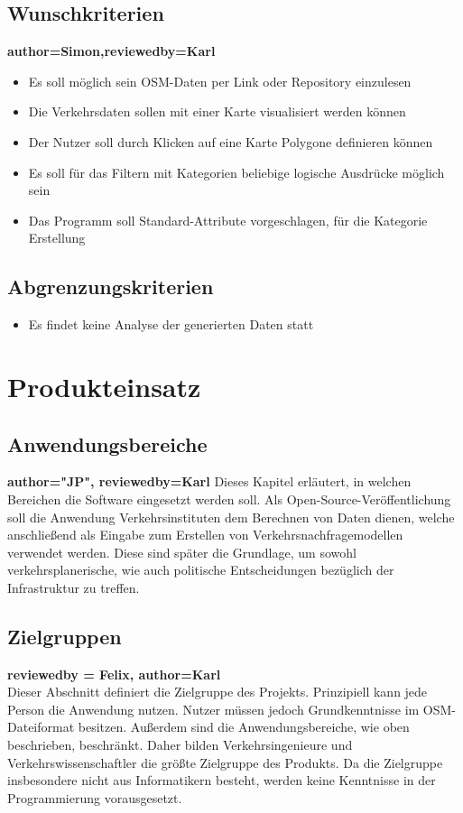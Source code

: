 \documentclass[parskip=full]{scrartcl} %
\begin{document}
\subsection{Wunschkriterien}
\textbf{author=Simon,reviewedby=Karl\\}
\begin{itemize}
    \item Es soll möglich sein OSM-Daten per Link oder Repository einzulesen
    \item Die Verkehrsdaten sollen mit einer Karte visualisiert werden können
    \item Der Nutzer soll durch Klicken auf eine Karte Polygone definieren können
    \item Es soll für das Filtern mit Kategorien beliebige logische Ausdrücke möglich sein
    \item Das Programm soll Standard-Attribute vorgeschlagen, für die Kategorie Erstellung
\end{itemize}


\subsection{Abgrenzungskriterien}
\begin{itemize}
    \item Es findet keine Analyse der generierten Daten statt
\end{itemize}
\newpage



\section{Produkteinsatz}

\subsection{Anwendungsbereiche}
\textbf{author="JP", reviewedby=Karl} 
Dieses Kapitel erläutert, in welchen Bereichen die Software eingesetzt werden soll. Als Open-Source-Veröffentlichung soll die Anwendung Verkehrsinstituten dem Berechnen von Daten dienen, welche anschließend als Eingabe zum Erstellen von Verkehrsnachfragemodellen verwendet werden. Diese sind später die Grundlage, um sowohl verkehrsplanerische, wie auch politische Entscheidungen bezüglich der Infrastruktur zu treffen.

\subsection{Zielgruppen}
\textbf{reviewedby = Felix, author=Karl\\}
Dieser Abschnitt definiert die Zielgruppe des Projekts. Prinzipiell kann jede Person die Anwendung nutzen. Nutzer müssen jedoch Grundkenntnisse im OSM-Dateiformat besitzen. Außerdem sind die Anwendungsbereiche, wie oben beschrieben, beschränkt. Daher bilden Verkehrsingenieure und Verkehrswissenschaftler die größte Zielgruppe des Produkts. Da die Zielgruppe insbesondere nicht aus Informatikern besteht, werden keine Kenntnisse in der Programmierung vorausgesetzt.
\end{document}
